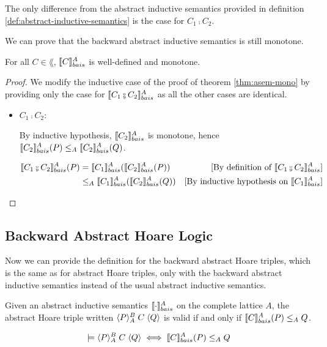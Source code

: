 \documentclass[
  10pt,       %
  twoside,    %
  a4paper,    %
  english,    %
  tikz,       %
  openright,  %
]{book}
\begin{document}
The only difference from the abstract inductive semantics provided in
definition \ref{def:abstract-inductive-semantics} is the case for $C_1 \fcmp
C_2$.

We can prove that the backward abstract inductive semantics is still monotone.

\begin{theorem}[Monotonicity]
  \label{thm:asem-mono-back} 
  For all $C \in \lang$, $\llbracket C \rrbracket_{bais}^{A}$ is well-defined and monotone.
\end{theorem}

\begin{proof}
  We modify the inductive case of the proof of theorem \ref{thm:asem-mono} by
  providing only the case for $\asemback{C_1 \fcmp C_2}$ as all the other cases
  are identical.

  \begin{itemize}
    \item $C_1 \fcmp C_2$:

      By inductive hypothesis, $\llbracket C_2 \rrbracket_{bais}^{A}$ is monotone, hence
      $\llbracket C_2 \rrbracket_{bais}^{A}(P) \leq_A \llbracket C_2 \rrbracket_{bais}^{A}(Q)$.

      \begin{align*}
        \asemback{C_1 \fcmp C_2}(P) 
          &= \asemback{C_1}(\asemback{C_2}(P))
          &\text{[By definition of $\asemback{C_1 \fcmp C_2}$]}\\
          &\leq_A \asemback{C_1}(\asemback{C_2}(Q))
          &\text{[By inductive hypothesis on $\asemback{C_1}$]} \\
      \end{align*}
  \end{itemize}
\end{proof}

\subsection{Backward Abstract Hoare Logic}

Now we can provide the definition for the backward abstract Hoare triples,
which is the same as for abstract Hoare triples, only with the backward
abstract inductive semantics instead of the usual abstract inductive semantics.

\begin{definition}
  \label{def:baht}
  Given an abstract inductive semantics $\llbracket \cdot \rrbracket_{bais}^{A}$ on the complete
  lattice $A$, the abstract Hoare triple written $\langle P \rangle_{A}^B \; C \; \langle Q \rangle$ is
  valid if and only if $\llbracket C \rrbracket_{bais}^{A}(P) \leq_A Q$.

  $$\models \langle P \rangle_{A}^B \; C \; \langle Q \rangle \iff \llbracket C \rrbracket_{bais}^{A}(P) \leq_A Q$$
\end{definition}
\end{document}
